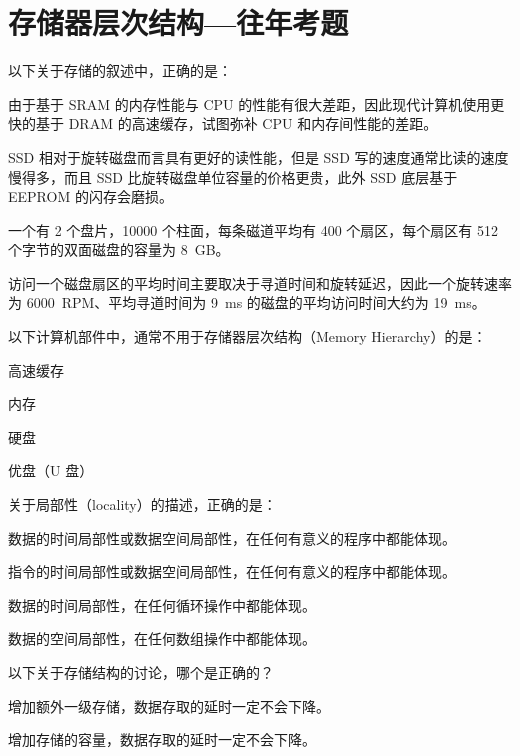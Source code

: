 \chapter{存储器层次结构{---}往年考题}
    \begin{problems}
         以下关于存储的叙述中，正确的是：
        \begin{choices}
            \item 由于基于 SRAM 的内存性能与 CPU 的性能有很大差距，因此现代计算机使用更快的基于 DRAM 的高速缓存，试图弥补 CPU 和内存间性能的差距。
            \item SSD 相对于旋转磁盘而言具有更好的读性能，但是 SSD 写的速度通常比读的速度慢得多，而且 SSD 比旋转磁盘单位容量的价格更贵，此外 SSD 底层基于 EEPROM 的闪存会磨损。
            \item 一个有 2 个盘片，10000 个柱面，每条磁道平均有 400 个扇区，每个扇区有 512 个字节的双面磁盘的容量为 \SI{8}{GB}。
            \item 访问一个磁盘扇区的平均时间主要取决于寻道时间和旋转延迟，因此一个旋转速率为 \SI{6000}{RPM}、平均寻道时间为 \SI{9}{ms} 的磁盘的平均访问时间大约为 \SI{19}{ms}。
        \end{choices}
         以下计算机部件中，通常不用于存储器层次结构（Memory Hierarchy）的是：
        \begin{choices}
            \item 高速缓存
            \item 内存
            \item 硬盘
            \item 优盘（U 盘）
        \end{choices}
         关于局部性（locality）的描述，正确的是：
        \begin{choices}
            \item 数据的时间局部性或数据空间局部性，在任何有意义的程序中都能体现。
            \item 指令的时间局部性或数据空间局部性，在任何有意义的程序中都能体现。
            \item 数据的时间局部性，在任何循环操作中都能体现。
            \item 数据的空间局部性，在任何数组操作中都能体现。
        \end{choices}
         以下关于存储结构的讨论，哪个是正确的？
        \begin{choices}
            \item 增加额外一级存储，数据存取的延时一定不会下降。
            \item 增加存储的容量，数据存取的延时一定不会下降。

\end{choices}
\end{problems}
